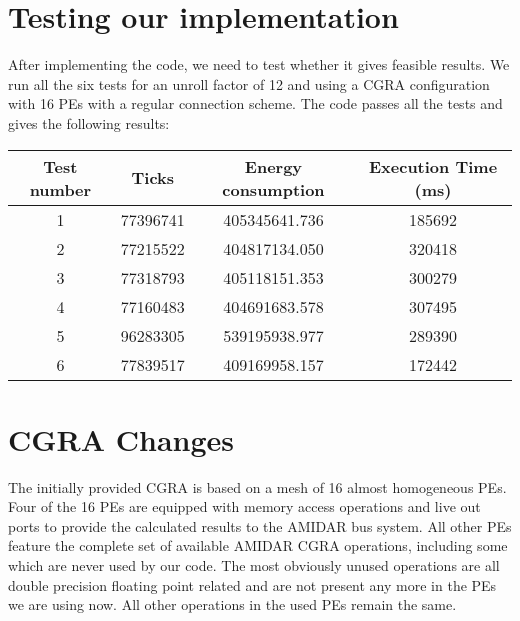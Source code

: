 		\section{Testing our implementation} %
	\label{sec:test_impl}
		After implementing the code, we need to test whether it gives feasible results. We run all the six tests for an unroll factor of 12 and using a CGRA configuration with 16 PEs with a regular connection scheme. The code passes all the tests and gives the following results:
		\begin{center}
			\begin{tabular}{||c | c c c ||} 
			\hline
			Test number & Ticks & Energy consumption & Execution Time (ms)\\ [0.5ex] 
			\hline\hline
			1 & 77396741 & 405345641.736 & 185692 \\
			\hline
			2 & 77215522 & 404817134.050 & 320418 \\
			\hline
			3 & 77318793 & 405118151.353 & 300279 \\
			\hline
			4 & 77160483 & 404691683.578 & 307495 \\
			\hline
			5 & 96283305 & 539195938.977 & 289390 \\  
			\hline
			6 & 77839517 & 409169958.157 & 172442 \\  
			\hline
			\end{tabular}
		\end{center}
		

	\section{CGRA Changes} %
	\label{sec:cgra_changes}
		The initially provided CGRA is based on a mesh of \num{16} almost homogeneous PEs. Four of the \num{16} PEs are equipped with memory access operations and live out ports to provide the calculated results to the AMIDAR bus system. All other PEs feature the complete set of available AMIDAR CGRA operations, including some which are never used by our code. The most obviously unused operations are all double precision floating point related and are not present any more in the PEs we are using now. All other operations in the used PEs remain the same.\newline
		
